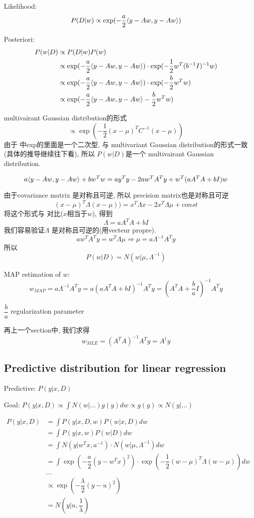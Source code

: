 \documentclass{article}
\begin{document}
Likelihood:
$$ P(D|w) \propto \exp(- \dfrac{a}{2} \langle y - Aw , y - Aw\rangle) $$

Posteriori:
\begin{equation}
\begin{aligned}
P(w|D) 
& \propto P(D|w) P(w) \\
& \propto \exp(- \dfrac{a}{2} \langle y - Aw , y - Aw\rangle) \cdot \exp(-\dfrac{1}{2} w^T (b^{-1}I)^{-1} w) \\
& \propto \exp(- \dfrac{a}{2} \langle y - Aw , y - Aw\rangle) \cdot \exp(-\dfrac{b}{2} w^T w) \\
& \propto \exp(- \dfrac{a}{2} \langle y - Aw , y - Aw\rangle -\dfrac{b}{2} w^T w) \\
\end{aligned}
\end{equation}

multivairant Gaussian distribution的形式
$$\propto \exp(-\dfrac{1}{2} (x - \mu)^T C^{-1} (x - \mu))$$
由于 \lasteq 中exp的里面是一个二次型, 与 multivariant Gaussian distribution的形式一致(具体的推导继续往下看), 所以
$P(w|D)$是一个 multivairant Gaussian distribution.

\begin{equation}
a \langle y - Aw , y - Aw\rangle + b w^T w = a y^T y - 2aw^TA^Ty + w^T(aA^TA+bI)w
\end{equation}

由于covariance matrix 是对称且可逆, 所以 precision matrix也是对称且可逆
$$(x - \mu)^T \Lambda (x - \mu)) = x^T \Lambda x - 2 x^T \Lambda \mu + const$$
将这个形式与 \lasteq 对比($x$相当于$w$), 得到
$$ \Lambda = aA^TA + bI $$
我们容易验证$\Lambda$ 是对称且可逆的(用vecteur propre).
$$a w^T A^T y = w^T \Lambda \mu \Rightarrow \mu = a \Lambda^{-1} A^T y$$
所以
$$P(w|D) = N(w| \mu, \Lambda^{-1})$$

\bigskip
MAP estimation of $w$: 
$$w_{MAP} = a \Lambda^{-1} A^T y = a (aA^TA + bI)^{-1}A^Ty = (A^TA + \dfrac{b}{a}I)^{-1} A^T y$$

$\dfrac{b}{a}$ regularization parameter

再上一个section中, 我们求得
$$w_{MLE} = (A^T A)^{-1} A^T y = A^\dagger y$$

\subsection{Predictive distribution for linear regression}
Predictive: $P(y|x, D)$

Goal: $P(y|x,D) \propto \int N(w|...) g(y)dw \propto g(y) \propto N(y|...)$

$$
\begin{aligned}
P(y|x, D)
& = \int P(y|x,D,w) P(w|x,D) dw \\
& = \int P(y|x,w) P(w|D) dw \\
& = \int N(y|w^Tx, a^{-1}) \cdot N(w|\mu, \Lambda^{-1}) dw \\
& = \int \exp( - \dfrac{a}{2} (y - w^Tx)^2) \cdot \exp( - \dfrac{1}{2} (w-\mu)^T \Lambda (w - \mu)) dw \\
& \ldots \\
& \propto \exp(-\dfrac{\lambda}{2} (y-u)^2) \\
& = N(y|u, \dfrac{1}{\lambda})
\end{aligned}
$$
\end{document}
